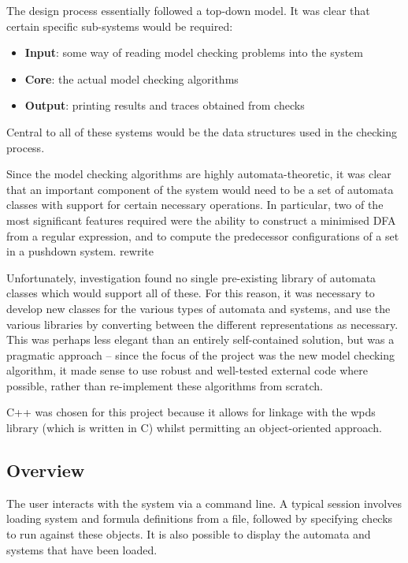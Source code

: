 \documentclass[11pt]{article}
\theoremstyle{definition}
\begin{document}
The design process essentially followed a top-down model. It was clear that
certain specific sub-systems would be required:
\begin{itemize}
\item{\textbf{Input}: some way of reading model checking problems into the system}
\item{\textbf{Core}:  the actual model checking algorithms}
\item{\textbf{Output}: printing results and traces obtained from checks}
\end{itemize}

Central to all of these systems would be the data structures used in the
checking process.  

Since the model checking algorithms are highly
automata-theoretic, it was clear that an important component of the system
would need to be a set of automata classes with support for certain necessary
operations. In particular, two of the most significant features required were
the ability to construct a minimised DFA from a regular expression, and to
compute the predecessor configurations of a set in a pushdown system. %
rewrite

Unfortunately, investigation found no single pre-existing library of automata
classes which would support all of these. For this reason, it was necessary to
develop new classes for the various types of automata and systems, and use the
various libraries by converting between the different representations as
necessary.  This was perhaps less elegant than an entirely self-contained
solution, but was a pragmatic approach -- since the focus of the project was
the new model checking algorithm, it made sense to use robust and well-tested
external code where possible, rather than re-implement these algorithms from
scratch.


C++ was chosen for this project because it allows for linkage with the wpds
library (which is written in C) whilst permitting an object-oriented approach.

\subsection{Overview}

The user interacts with the system via a command line. A typical session
involves loading system and formula definitions from a file, followed by
specifying checks to run against these objects. It is also possible to display
the automata and systems that have been loaded.
\end{document}
